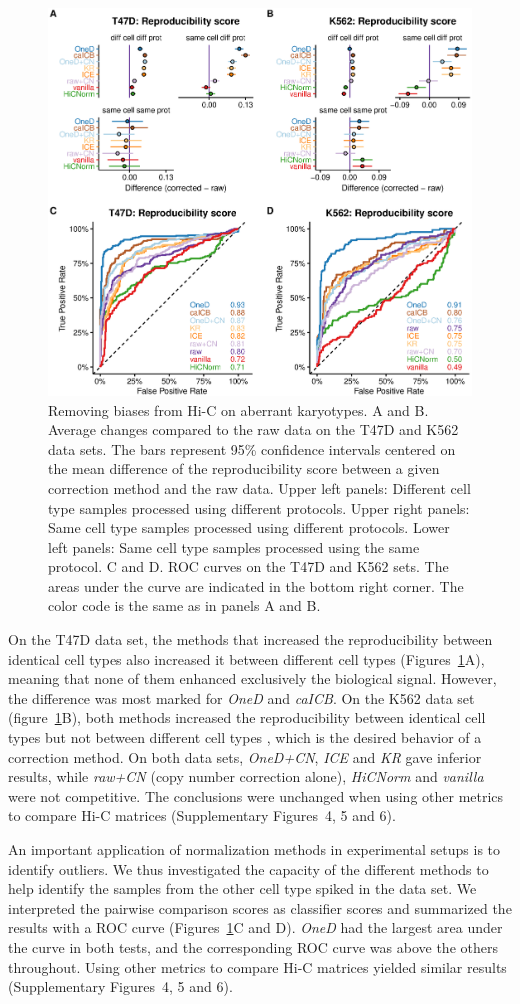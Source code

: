 \documentclass[a4,center,fleqn]{NAR}
\begin{document}
\begin{figure}
\centerline{\includegraphics[width=.49\textwidth]
  {nar_figures/figure_2.eps}}
\caption{Removing biases from Hi-C on aberrant karyotypes. A and B.
Average changes compared to the raw data on the T47D and K562 data sets.
The bars represent 95\% confidence intervals centered on the mean
difference of the reproducibility score between a given correction method
and the raw data. Upper left panels: Different cell type samples
processed using different protocols. Upper right panels: Same cell
type samples processed using different protocols. Lower left panels:
Same cell type samples processed using the same protocol. C and D. ROC
curves on the T47D and K562 sets. The areas under the curve are
indicated in the bottom right corner. The color code is the same as in
panels A and B.}
\label{fig:aberrant}
\end{figure}

On the T47D data set, the methods that increased the reproducibility
between identical cell types also increased it between different cell
types (Figures~\ref{fig:aberrant}A), meaning that none of them enhanced
exclusively the biological signal. However, the difference was most marked
for \textit{OneD} and \textit{caICB}. On the K562 data set
(figure~\ref{fig:aberrant}B), both methods increased the reproducibility
between identical cell types but not between different cell types
, which is the desired behavior of a
correction method. On both data sets, \textit{OneD+CN}, \textit{ICE} and
\textit{KR} gave inferior results, while \textit{raw+CN} (copy number
correction alone), \textit{HiCNorm} and \textit{vanilla} were not competitive.
The conclusions were unchanged when using other metrics to compare Hi-C
matrices (Supplementary Figures~4, 5 and 6).

An important application of normalization methods in experimental setups
is to identify outliers. We thus investigated the capacity of the
different methods to help identify the samples from the other cell type
spiked in the data set. We interpreted the pairwise comparison scores as
classifier scores and summarized the results with a ROC curve
(Figures~\ref{fig:aberrant}C and D). \textit{OneD} had the largest area
under the curve in both tests, and the corresponding ROC curve was above
the others throughout. Using other metrics to compare Hi-C matrices
yielded similar results (Supplementary Figures~4, 5 and 6).
\end{document}

